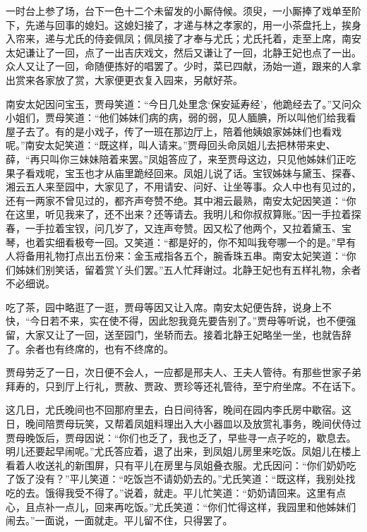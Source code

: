 \documentclass[12pt,oneside]{book}
\begin{document}
一时台上参了场，台下一色十二个未留发的小厮侍候。须臾，一小厮捧了戏单至阶下，先递与回事的媳妇。这媳妇接了，才递与林之孝家的，用一小茶盘托上，挨身入帘来，递与尤氏的侍妾佩凤；佩凤接了才奉与尤氏；尤氏托着，走至上席，南安太妃谦让了一回，点了一出吉庆戏文，然后又谦让了一回，北静王妃也点了一出。众人又让了一回，命随便拣好的唱罢了。少时，菜已四献，汤始一道，跟来的人拿出赏来各家放了赏，大家便更衣复入园来，另献好茶。

南安太妃因问宝玉，贾母笑道：“今日几处里念‘保安延寿经’，他跪经去了。”又问众小姐们，贾母笑道：“他们姊妹们病的病，弱的弱，见人腼腆，所以叫他们给我看屋子去了。有的是小戏子，传了一班在那边厅上，陪着他姨娘家姊妹们也看戏呢。”南安太妃笑道：“既这样，叫人请来。”贾母回头命凤姐儿去把林带来史、薛，“再只叫你三妹妹陪着来罢。”凤姐答应了，来至贾母这边，只见他姊妹们正吃果子看戏呢，宝玉也才从庙里跪经回来。凤姐儿说了话。宝钗姊妹与黛玉、探春、湘云五人来至园中，大家见了，不用请安、问好、让坐等事。众人中也有见过的，还有一两家不曾见过的，都齐声夸赞不绝。其中湘云最熟，南安太妃因笑道：“你在这里，听见我来了，还不出来？还等请去。我明儿和你叔叔算账。”因一手拉着探春，一手拉着宝钗，问几岁了，又连声夸赞。因又松了他两个，又拉着黛玉、宝琴，也着实细看极夸一回。又笑道：“都是好的，你不知叫我夸哪一个的是。”早有人将备用礼物打点出五份来：金玉戒指各五个，腕香珠五串。南安太妃笑道：“你们姊妹们别笑话，留着赏丫头们罢。”五人忙拜谢过。北静王妃也有五样礼物，余者不必细说。

吃了茶，园中略逛了一逛，贾母等因又让入席。南安太妃便告辞，说身上不快，“今日若不来，实在使不得，因此恕我竟先要告别了。”贾母等听说，也不便强留，大家又让了一回，送至园门，坐轿而去。接着北静王妃略坐一坐，也就告辞了。余者也有终席的，也有不终席的。

贾母劳乏了一日，次日便不会人，一应都是邢夫人、王夫人管待。有那些世家子弟拜寿的，只到厅上行礼，贾赦、贾政、贾珍等还礼管待，至宁府坐席。不在话下。

这几日，尤氏晚间也不回那府里去，白日间待客，晚间在园内李氏房中歇宿。这日，晚间陪贾母玩笑，又帮着凤姐料理出入大小器皿以及放赏礼事务，晚间伏侍过贾母晚饭后，贾母因说：“你们也乏了，我也乏了，早些寻一点子吃的，歇息去。明儿还要起早闹呢。”尤氏答应着，退了出来，到凤姐儿房里来吃饭。凤姐儿在楼上看着人收送礼的新围屏，只有平儿在房里与凤姐叠衣服。尤氏因问：“你们奶奶吃了饭了没有？”平儿笑道：“吃饭岂不请奶奶去的。”尤氏笑道：“既这样，我别处找吃的去。饿得我受不得了。”说着，就走。平儿忙笑道：“奶奶请回来。这里有点心，且点补一点儿，回来再吃饭。”尤氏笑道：“你们忙得这样，我园里和他姊妹们闹去。”一面说，一面就走。平儿留不住，只得罢了。
\end{document}
